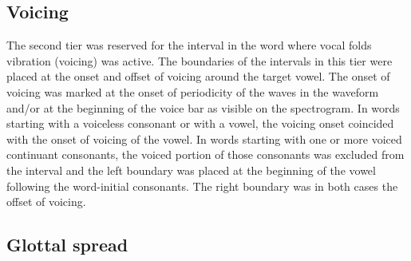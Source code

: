 \documentclass[11pt,a4paper,openany]{memoir}\usepackage[]{graphicx}\usepackage[]{color}
\begin{document}
\subsection{Voicing}

The second tier was reserved for the interval in the word where vocal folds vibration (voicing) was active.
The boundaries of the intervals in this tier were placed at the onset and offset of voicing around the target vowel.
The onset of voicing was marked at the onset of periodicity of the waves in the waveform and/or at the beginning of the voice bar as visible on the spectrogram.
In words starting with a voiceless consonant or with a vowel, the voicing onset coincided with the onset of voicing of the vowel.
In words starting with one or more voiced continuant consonants, the voiced portion of those consonants was excluded from the interval and the left boundary was placed at the beginning of the vowel following the word-initial consonants.
The right boundary was in both cases the offset of voicing.

\subsection{Glottal spread}
\end{document}

